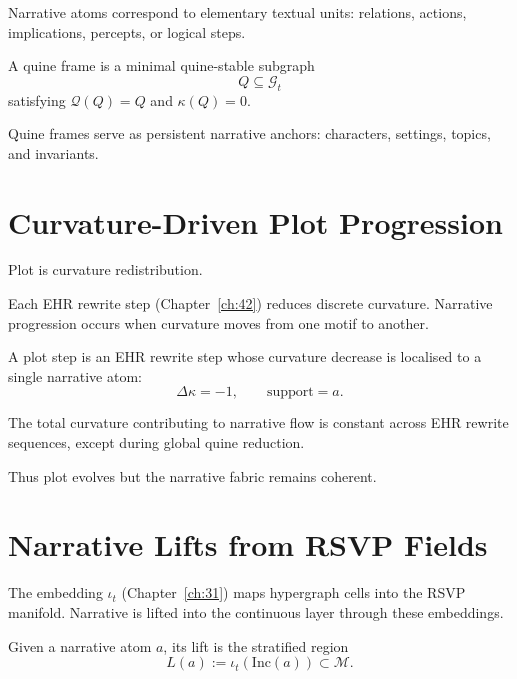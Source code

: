 Narrative atoms correspond to elementary textual units:
relations, actions, implications, percepts, or logical steps.

\begin{definition}
A quine frame is a minimal quine-stable subgraph
\[
Q \subseteq \mathcal{G}_t
\]
satisfying $\mathcal{Q}(Q)=Q$ and $\kappa(Q)=0$.
\end{definition}

Quine frames serve as persistent narrative anchors: characters, settings,
topics, and invariants.


\section{Curvature-Driven Plot Progression}
\label{sec:54:plot-progression}

Plot is curvature redistribution.

Each EHR rewrite step (Chapter~\ref{ch:42}) reduces discrete curvature.  
Narrative progression occurs when curvature moves from one motif to another.

\begin{definition}
A plot step is an EHR rewrite step whose curvature decrease is localised to
a single narrative atom:
\[
\Delta \kappa = -1, \qquad \text{support} = a.
\]
\end{definition}

\begin{theorem}
The total curvature contributing to narrative flow is constant across EHR
rewrite sequences, except during global quine reduction.
\end{theorem}

Thus plot evolves but the narrative fabric remains coherent.


\section{Narrative Lifts from RSVP Fields}
\label{sec:54:lifts}

The embedding $\iota_t$ (Chapter~\ref{ch:31}) maps hypergraph cells into the
RSVP manifold.  
Narrative is lifted into the continuous layer through these embeddings.

\begin{definition}
Given a narrative atom $a$, its lift is the stratified region
\[
L(a) := \iota_t(\mathrm{Inc}(a)) \subset \mathcal{M}.
\]
\end{definition}

